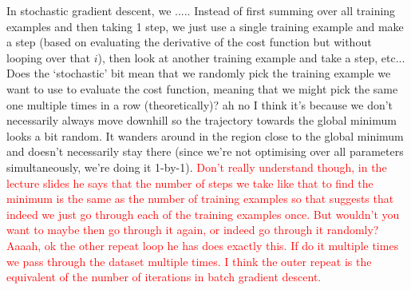 \documentclass[a4paper, 10pt,hidelinks]{article}
\newcommand{\ind}[1]{^{(#1)}}
\begin{document}
In stochastic gradient descent, we ..... %
Instead of first summing over all training examples and then taking 1 step, we just use a single training example and make a step (based on evaluating the derivative of the cost function but without looping over that $i$), then look at another training example and take a step, etc... Does the `stochastic' bit mean that we randomly pick the training example we want to use to evaluate the cost function, meaning that we might pick the same one multiple times in a row (theoretically)? ah no I think it's because we don't necessarily always move downhill so the trajectory towards the global minimum looks a bit random. It wanders around in the region close to the global minimum and doesn't necessarily stay there (since we're not optimising over all parameters simultaneously, we're doing it 1-by-1). \textcolor{red}{Don't really understand though, in the lecture slides he says that the number of steps we take like that to find the minimum is the same as the number of training examples so that suggests that indeed we just go through each of the training examples once. But wouldn't you want to maybe then go through it again, or indeed go through it randomly? Aaaah, ok the other repeat loop he has does exactly this. If do it multiple times we pass through the dataset multiple times. I think the outer repeat is the equivalent of the number of iterations in batch gradient descent.}%
\end{document}
